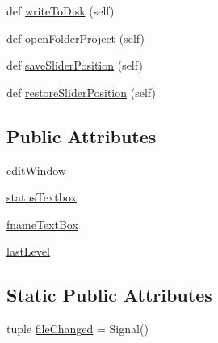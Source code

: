 \begin{DoxyCompactItemize}
\item 
def \hyperlink{classsoftware_1_1chipwhisperer_1_1common_1_1ui_1_1ProjectTextEditor_1_1ProjectTextEditor_a0203095d0e3ac314dca821c9004330a6}{write\+To\+Disk} (self)
\item 
def \hyperlink{classsoftware_1_1chipwhisperer_1_1common_1_1ui_1_1ProjectTextEditor_1_1ProjectTextEditor_a7dbc4a094ac91ce01828f2c5e65f251d}{open\+Folder\+Project} (self)
\item 
def \hyperlink{classsoftware_1_1chipwhisperer_1_1common_1_1ui_1_1ProjectTextEditor_1_1ProjectTextEditor_aeb113051305bc04853d6bd1ca91537df}{save\+Slider\+Position} (self)
\item 
def \hyperlink{classsoftware_1_1chipwhisperer_1_1common_1_1ui_1_1ProjectTextEditor_1_1ProjectTextEditor_af49d1bc1abd52e3c11f8f9bfa0483170}{restore\+Slider\+Position} (self)
\end{DoxyCompactItemize}
\subsection*{Public Attributes}
\begin{DoxyCompactItemize}
\item 
\hyperlink{classsoftware_1_1chipwhisperer_1_1common_1_1ui_1_1ProjectTextEditor_1_1ProjectTextEditor_a7c21e2939513052cef9811cf3155bd7c}{edit\+Window}
\item 
\hyperlink{classsoftware_1_1chipwhisperer_1_1common_1_1ui_1_1ProjectTextEditor_1_1ProjectTextEditor_aa05d65608805e607efb1c0061ed064a7}{status\+Textbox}
\item 
\hyperlink{classsoftware_1_1chipwhisperer_1_1common_1_1ui_1_1ProjectTextEditor_1_1ProjectTextEditor_a8c7c7e2a14901f2615cd9acfa2b73d41}{fname\+Text\+Box}
\item 
\hyperlink{classsoftware_1_1chipwhisperer_1_1common_1_1ui_1_1ProjectTextEditor_1_1ProjectTextEditor_adcd000673f3e68af838a6a67dd841283}{last\+Level}
\end{DoxyCompactItemize}
\subsection*{Static Public Attributes}
\begin{DoxyCompactItemize}
\item 
tuple \hyperlink{classsoftware_1_1chipwhisperer_1_1common_1_1ui_1_1ProjectTextEditor_1_1ProjectTextEditor_a4360750a0446fb1402db2b357b15a81a}{file\+Changed} = Signal()
\end{DoxyCompactItemize}


